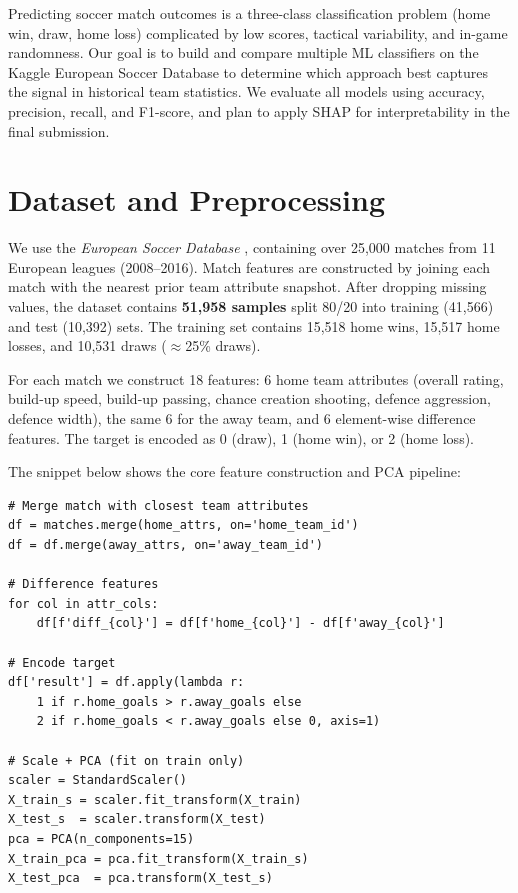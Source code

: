\documentclass[conference]{IEEEtran}
\begin{document}
Predicting soccer match outcomes is a three-class classification problem (home win, draw, home loss) complicated by low scores, tactical variability, and in-game randomness. Our goal is to build and compare multiple ML classifiers on the Kaggle European Soccer Database \cite{kaggle_soccer} to determine which approach best captures the signal in historical team statistics. We evaluate all models using accuracy, precision, recall, and F1-score, and plan to apply SHAP for interpretability in the final submission.

\section{Dataset and Preprocessing}

We use the \textit{European Soccer Database} \cite{kaggle_soccer}, containing over 25,000 matches from 11 European leagues (2008--2016). Match features are constructed by joining each match with the nearest prior team attribute snapshot. After dropping missing values, the dataset contains \textbf{51,958 samples} split 80/20 into training (41,566) and test (10,392) sets. The training set contains 15,518 home wins, 15,517 home losses, and 10,531 draws ($\approx$25\% draws).

For each match we construct 18 features: 6 home team attributes (overall rating, build-up speed, build-up passing, chance creation shooting, defence aggression, defence width), the same 6 for the away team, and 6 element-wise difference features. The target is encoded as 0 (draw), 1 (home win), or 2 (home loss).

The snippet below shows the core feature construction and PCA pipeline:

\begin{lstlisting}
# Merge match with closest team attributes
df = matches.merge(home_attrs, on='home_team_id')
df = df.merge(away_attrs, on='away_team_id')

# Difference features
for col in attr_cols:
    df[f'diff_{col}'] = df[f'home_{col}'] - df[f'away_{col}']

# Encode target
df['result'] = df.apply(lambda r:
    1 if r.home_goals > r.away_goals else
    2 if r.home_goals < r.away_goals else 0, axis=1)

# Scale + PCA (fit on train only)
scaler = StandardScaler()
X_train_s = scaler.fit_transform(X_train)
X_test_s  = scaler.transform(X_test)
pca = PCA(n_components=15)
X_train_pca = pca.fit_transform(X_train_s)
X_test_pca  = pca.transform(X_test_s)
\end{lstlisting}
\end{document}
